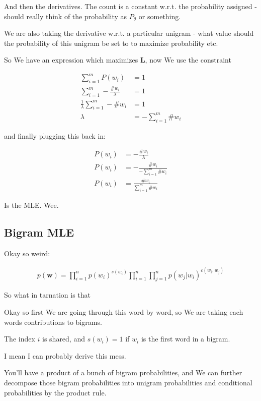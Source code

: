 \documentclass{article}
\begin{document}
		And then the derivatives. The count is a constant w.r.t. the probability assigned - should really think of the probability as $P_\theta$ or something.
		
		We are also taking the derivative w.r.t. a particular unigram - what value should the probability of this unigram be set to to maximize probability etc.
		
		So We have an expression which maximizes $\mathbf{L}$, now We use the constraint 
		
		\begin{align}
			\sum^m_{i=1} P(w_i) &= 1\\
			\sum^m_{i=1} -\frac{\#w_i}{\lambda}  &= 1\\
			\frac{1}{\lambda}\sum^m_{i=1} -\#w_i  &= 1\\
			\lambda &= -\sum^m_{i=1} \#w_i
		\end{align}
		
		and finally plugging this back in:
		
		\begin{align}
			P(w_i)&= -\frac{\#w_i}{\lambda} \\
			P(w_i)&= -\frac{\#w_i}{-\sum^m_{i=1} \#w_i}\\
			P(w_i)&= \frac{\#w_i}{\sum^m_{i=1} \#w_i}
		\end{align}
		
		Is the MLE. Wee.
		
	\subsection{Bigram MLE}
	
		Okay so weird:
		
		\begin{align}
			p(\mathbf{w}) = \prod^n_{i=1} p(w_i)^{s(w_i)}\prod^n_{i=1}\prod^n_{j=1} p(w_j|w_i)^{c(w_i, w_j)}
		\end{align}
		
		So what in tarnation is that
		
		Okay so first We are going through this word by word, so We are taking each words contributions to bigrams. 
		
		The index $i$ is shared, and $s(w_i) = 1$ if $w_i$ is the first word in a bigram.
		
		I mean I can probably derive this mess. 
		
		You'll have a product of a bunch of bigram probabilities, and We can further decompose those bigram probabilities into unigram probabilities and conditional probabilities by the product rule.
		
\end{document}
